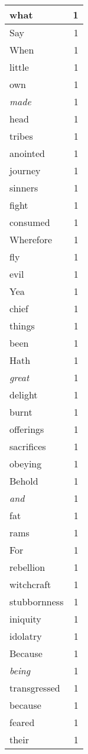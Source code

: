 \begin{center}
\begin{longtable}{l|r}
what & 1 \\ \hline
Say & 1 \\ \hline
When & 1 \\ \hline
little & 1 \\ \hline
own & 1 \\ \hline
\emph{made} & 1 \\ \hline
head & 1 \\ \hline
tribes & 1 \\ \hline
anointed & 1 \\ \hline
journey & 1 \\ \hline
sinners & 1 \\ \hline
fight & 1 \\ \hline
consumed & 1 \\ \hline
Wherefore & 1 \\ \hline
fly & 1 \\ \hline
evil & 1 \\ \hline
Yea & 1 \\ \hline
chief & 1 \\ \hline
things & 1 \\ \hline
been & 1 \\ \hline
Hath & 1 \\ \hline
\emph{great} & 1 \\ \hline
delight & 1 \\ \hline
burnt & 1 \\ \hline
offerings & 1 \\ \hline
sacrifices & 1 \\ \hline
obeying & 1 \\ \hline
Behold & 1 \\ \hline
\emph{and} & 1 \\ \hline
fat & 1 \\ \hline
rams & 1 \\ \hline
For & 1 \\ \hline
rebellion & 1 \\ \hline
witchcraft & 1 \\ \hline
stubbornness & 1 \\ \hline
iniquity & 1 \\ \hline
idolatry & 1 \\ \hline
Because & 1 \\ \hline
\emph{being} & 1 \\ \hline
transgressed & 1 \\ \hline
because & 1 \\ \hline
feared & 1 \\ \hline
their & 1 \\ \hline

\end{longtable}
\end{center}
